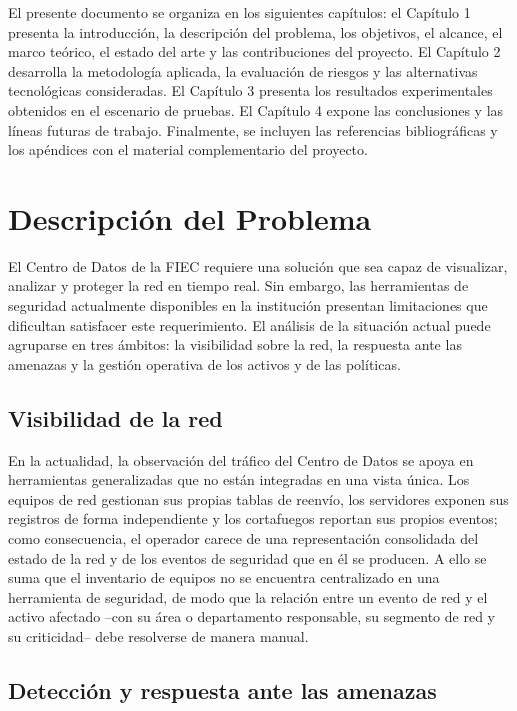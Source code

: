 El presente documento se organiza en los siguientes cap\'itulos: el Cap\'itulo 1 presenta la introducci\'on, la descripci\'on del problema, los objetivos, el alcance, el marco te\'orico, el estado del arte y las contribuciones del proyecto. El Cap\'itulo 2 desarrolla la metodolog\'ia aplicada, la evaluaci\'on de riesgos y las alternativas tecnol\'ogicas consideradas. El Cap\'itulo 3 presenta los resultados experimentales obtenidos en el escenario de pruebas. El Cap\'itulo 4 expone las conclusiones y las l\'ineas futuras de trabajo. Finalmente, se incluyen las referencias bibliogr\'aficas y los ap\'endices con el material complementario del proyecto.

\section{Descripci\'on del Problema}

El Centro de Datos de la FIEC requiere una soluci\'on que sea capaz de visualizar, analizar y proteger la red en tiempo real. Sin embargo, las herramientas de seguridad actualmente disponibles en la instituci\'on presentan limitaciones que dificultan satisfacer este requerimiento. El an\'alisis de la situaci\'on actual puede agruparse en tres \'ambitos: la visibilidad sobre la red, la respuesta ante las amenazas y la gesti\'on operativa de los activos y de las pol\'iticas.

\subsection{Visibilidad de la red}

En la actualidad, la observaci\'on del tr\'afico del Centro de Datos se apoya en herramientas generalizadas que no est\'an integradas en una vista \'unica. Los equipos de red gestionan sus propias tablas de reenv\'io, los servidores exponen sus registros de forma independiente y los cortafuegos reportan sus propios eventos; como consecuencia, el operador carece de una representaci\'on consolidada del estado de la red y de los eventos de seguridad que en \'el se producen. A ello se suma que el inventario de equipos no se encuentra centralizado en una herramienta de seguridad, de modo que la relaci\'on entre un evento de red y el activo afectado --con su \'area o departamento responsable, su segmento de red y su criticidad-- debe resolverse de manera manual.

\subsection{Detecci\'on y respuesta ante las amenazas}

